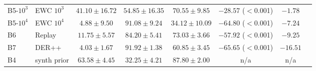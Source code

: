 \begin{table}[ht]
\begin{tabular}{llccc@{\hskip 6pt}ccc}
B5-$10^3$ & EWC $10^3$ & $41.10 \pm 16.72$ & $54.85 \pm 16.35$ & $70.55 \pm 9.85$ & $-28.57$ ($<$0.001) & $-1.78$ \\
B5-$10^4$ & EWC $10^4$ & $4.88 \pm 9.50$ & $91.08 \pm 9.24$ & $34.12 \pm 10.09$ & $-64.80$ ($<$0.001) & $-7.24$ \\
B6 & Replay & $11.75 \pm 5.57$ & $84.20 \pm 5.41$ & $73.03 \pm 3.66$ & $-57.92$ ($<$0.001) & $-9.25$ \\
B7 & DER++ & $4.03 \pm 1.67$ & $91.92 \pm 1.38$ & $60.85 \pm 3.45$ & $-65.65$ ($<$0.001) & $-16.51$ \\
B4 & synth prior & $63.58 \pm 4.45$ & $32.25 \pm 4.21$ & $87.80 \pm 2.00$ & n/a & n/a \\
\bottomrule
\end{tabular}
\end{table}
